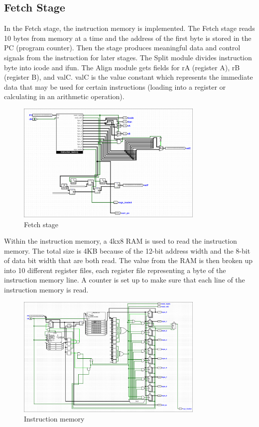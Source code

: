 \documentclass{article}
\begin{document}
\subsection{Fetch Stage}
In the Fetch stage, the instruction memory is implemented. 
The Fetch stage reads 10 bytes from memory at a time and the address of the first byte is stored in the PC (program counter). 
Then the stage produces meaningful data and control signals from the instruction for later stages. 
The Split module divides instruction byte into icode and ifun. 
The Align module gets fields for rA (register A), rB (register B), and valC. 
valC is the value constant which represents the immediate data that may be used for certain instructions (loading into a register or calculating in an arithmetic operation). 

\begin{figure}[H]
    \centering
    \includegraphics[width=0.8\textwidth]{./images/fetch.png}
    \caption{Fetch stage}
\end{figure}

Within the instruction memory, a 4kx8 RAM is used to read the instruction memory. 
The total size is 4KB because of the 12-bit address width and the 8-bit of data bit width that are both read. 
The value from the RAM is then broken up into 10 different register files, each register file representing a byte of the instruction memory line. 
A counter is set up to make sure that each line of the instruction memory is read. 

\begin{figure}[H]
    \centering
    \includegraphics[width=0.8\textwidth]{./images/instruction_memory.png}
    \caption{Instruction memory}
\end{figure}
\end{document}
